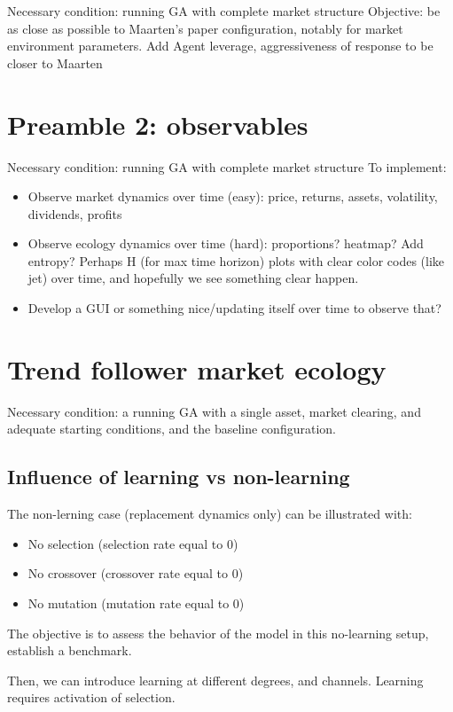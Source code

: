 \documentclass{article}
\begin{document}
Necessary condition: running GA with complete market structure
Objective: be as close as possible to Maarten's paper configuration, notably for market environment parameters.
Add Agent leverage, aggressiveness of response to be closer to Maarten
\section{Preamble 2: observables}

Necessary condition: running GA with complete market structure
To implement:
\begin{itemize}
    \item Observe market dynamics over time (easy): price, returns, assets, volatility, dividends, profits
    \item Observe ecology dynamics over time (hard): proportions? heatmap? Add entropy?
    Perhaps H (for max time horizon) plots with clear color codes (like jet) over time, and hopefully we see something clear happen.
    \item Develop a GUI or something nice/updating itself over time to observe that?
\end{itemize}

\section{Trend follower market ecology}

Necessary condition: a running GA with a single asset, market clearing, and adequate starting conditions, and the baseline configuration.

\subsection{Influence of learning vs non-learning}
The non-lerning case (replacement dynamics only) can be illustrated with:
\begin{itemize}
    \item No selection (selection rate equal to 0)
    \item No crossover (crossover rate equal to 0)
    \item No mutation (mutation rate equal to 0)
\end{itemize}
The objective is to assess the behavior of the model in this no-learning setup, establish a benchmark.

Then, we can introduce learning at different degrees, and channels. Learning requires activation of selection.
\end{document}
